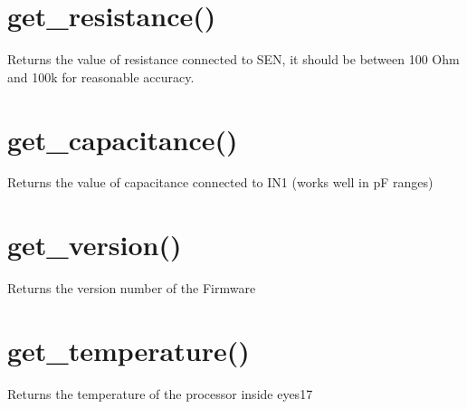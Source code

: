 \documentclass[a4paper,12pt,english]{sphinxmanual}
\begin{document}
\section{get\_resistance()}
\label{\detokenize{9.0:get-resistance}}
Returns the value of resistance connected to SEN, it should be between
100 Ohm and 100k for reasonable accuracy.

\begin{sphinxVerbatim}[commandchars=\\\{\}]
 
\end{sphinxVerbatim}


\section{get\_capacitance()}
\label{\detokenize{9.0:get-capacitance}}
Returns the value of capacitance connected to IN1 (works well in pF
ranges)

\begin{sphinxVerbatim}[commandchars=\\\{\}]
 
\end{sphinxVerbatim}


\section{get\_version()}
\label{\detokenize{9.0:get-version}}
Returns the version number of the Firmware

\begin{sphinxVerbatim}[commandchars=\\\{\}]
 
\end{sphinxVerbatim}


\section{get\_temperature()}
\label{\detokenize{9.0:get-temperature}}
Returns the temperature of the processor inside eyes17

\begin{sphinxVerbatim}[commandchars=\\\{\}]
 
\end{sphinxVerbatim}
\end{document}
